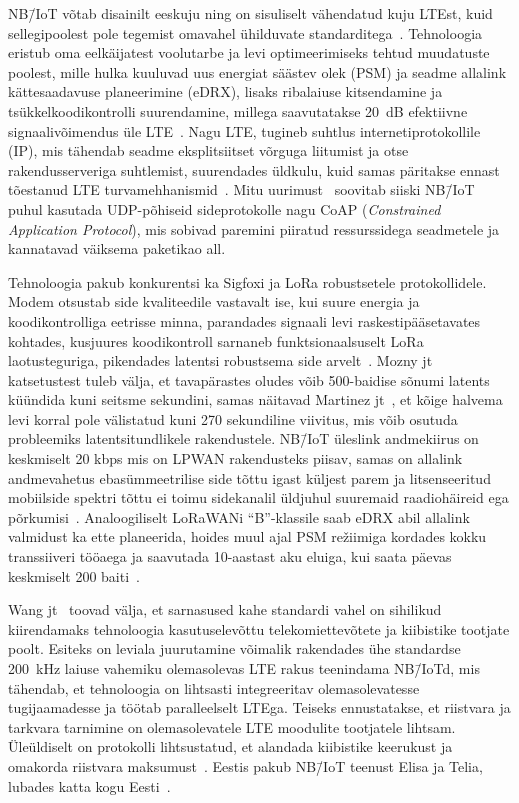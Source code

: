 \documentclass[12pt]{article}
\begin{document}
    NB\=/IoT võtab disainilt eeskuju ning on sisuliselt vähendatud kuju LTEst, kuid sellegipoolest pole tegemist omavahel ühilduvate standarditega~\cite{wanglin}.
    Tehnoloogia eristub oma eelkäijatest voolutarbe ja levi optimeerimiseks tehtud muudatuste poolest, mille hulka kuuluvad uus energiat säästev olek (PSM) ja seadme allalink kättesaadavuse planeerimine (eDRX), lisaks ribalaiuse kitsendamine ja tsükkelkoodikontrolli suurendamine, millega saavutatakse \SI{20}{\deci\bel} efektiivne signaalivõimendus üle LTE~\cite{xuyao}.
    Nagu LTE, tugineb suhtlus internetiprotokollile (IP), mis tähendab seadme eksplitsiitset võrguga liitumist ja otse rakendusserveriga suhtlemist, suurendades üldkulu, kuid samas päritakse ennast tõestanud LTE turvamehhanismid~\cite{basu}.
    Mitu uurimust~\cite{wirges, larmo} soovitab siiski NB\=/IoT puhul kasutada UDP-põhiseid sideprotokolle nagu CoAP (\textit{Constrained Application Protocol}), mis sobivad paremini piiratud ressurssidega seadmetele ja kannatavad väiksema paketikao all.

    Tehnoloogia pakub konkurentsi ka Sigfoxi ja LoRa robustsetele protokollidele.
    Modem otsustab side kvaliteedile vastavalt ise, kui suure energia ja koodikontrolliga eetrisse minna, parandades signaali levi raskestipääsetavates kohtades, kusjuures koodikontroll sarnaneb funktsionaalsuselt LoRa laotusteguriga, pikendades latentsi robustsema side arvelt~\cite{martinez}.
    Mozny jt~\cite{mozny} katsetustest tuleb välja, et tavapärastes oludes võib 500-baidise sõnumi latents küündida kuni seitsme sekundini, samas näitavad Martinez jt~\cite{martinez}, et kõige halvema levi korral pole välistatud kuni 270 sekundiline viivitus, mis võib osutuda probleemiks latentsitundlikele rakendustele.
    NB\=/IoT üleslink andmekiirus on keskmiselt 20 kbps mis on LPWAN rakendusteks piisav, samas on allalink andmevahetus ebasümmeetrilise side tõttu igast küljest parem ja litsenseeritud mobiilside spektri tõttu ei toimu sidekanalil üldjuhul suuremaid raadiohäireid ega põrkumisi~\cite{wanglin}.
    Analoogiliselt LoRaWANi "`B"'-klassile saab eDRX abil allalink valmidust ka ette planeerida, hoides muul ajal PSM režiimiga kordades kokku transsiiveri tööaega ja saavutada 10-aastast aku eluiga, kui saata päevas keskmiselt 200 baiti~\cite{wanglin}.

    Wang jt~\cite{wanglin} toovad välja, et sarnasused kahe standardi vahel on sihilikud kiirendamaks tehnoloogia kasutuselevõttu telekomiettevõtete ja kiibistike tootjate poolt.
    Esiteks on leviala juurutamine võimalik rakendades ühe standardse \SI{200}{\kilo\hertz} laiuse vahemiku olemasolevas LTE rakus teenindama NB\=/IoTd, mis tähendab, et tehnoloogia on lihtsasti integreeritav olemasolevatesse tugijaamadesse ja töötab paralleelselt LTEga.
    Teiseks ennustatakse, et riistvara ja tarkvara tarnimine on olemasolevatele LTE moodulite tootjatele lihtsam.
    Üleüldiselt on protokolli lihtsustatud, et alandada kiibistike keerukust ja omakorda riistvara maksumust~\cite{xuyao}.
    Eestis pakub NB\=/IoT teenust Elisa ja Telia, lubades katta kogu Eesti~\cite{nbtelia}.
\end{document}
